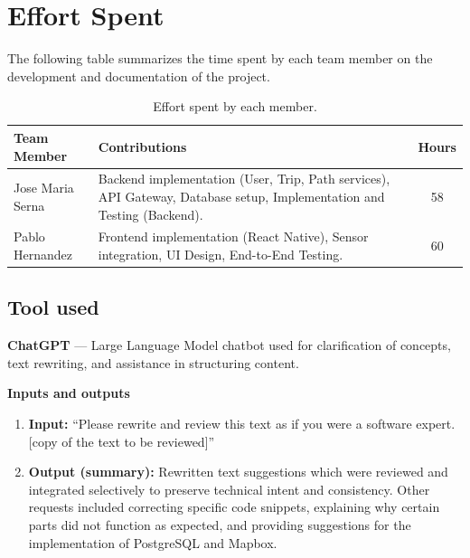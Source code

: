 \section{Effort Spent}
\label{sec:effort_spent}%

The following table summarizes the time spent by each team member on the development and documentation of the project.

\begin{table}[H]
    \centering
    \begin{tabular}{|l|p{}|c|}
        \hline
        \textbf{Team Member} & \textbf{Contributions} & \textbf{Hours} \\
        \hline
        Jose Maria Serna & Backend implementation (User, Trip, Path services), API Gateway, Database setup, Implementation and Testing (Backend). & 58 \\
        \hline
        Pablo Hernandez & Frontend implementation (React Native), Sensor integration, UI Design, End-to-End Testing. & 60 \\
        \hline
    \end{tabular}
    \caption{Effort spent by each member.}
    \label{tab:effort_spent}
\end{table}

\subsection{Tool used}

\textbf{ChatGPT} --- Large Language Model chatbot used for clarification of concepts, text rewriting, and assistance in structuring content.

\textbf{Inputs and outputs}
\begin{enumerate}
    \item \textbf{Input:} ``Please rewrite and review this text as if you were a software expert. [copy of the text to be reviewed]''
    \item \textbf{Output (summary):} Rewritten text suggestions which were reviewed and integrated selectively to preserve technical intent and consistency. Other requests included correcting specific code snippets, explaining why certain parts did not function as expected, and providing suggestions for the implementation of PostgreSQL and Mapbox.
\end{enumerate}
